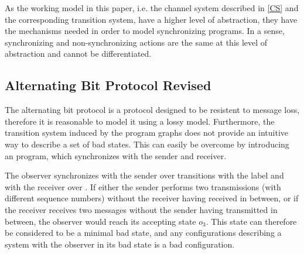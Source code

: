 As the working model in this paper, i.e. the channel system described in \ref{CS} and the corresponding transition system, have a higher level of abstraction, they have the mechanisms needed in order to model synchronizing programs. In a sense, synchronizing and non-synchronizing actions are the same at this level of abstraction and cannot be differentiated.

\subsection{Alternating Bit Protocol Revised}
The alternating bit protocol is a protocol designed to be resistent to message loss, therefore it is reasonable to model it using a lossy model. Furthermore, the transition system induced by the program graphs  does not provide an intuitive way to describe a set  of bad states. This can easily be overcome by introducing an  program, which synchronizes with the sender and receiver.

\begin{figure}[h!]
\abpobserver
\label{abpobserver}
\end{figure}

The observer synchronizes with the sender over transitions with the label  and with the receiver over . If either the sender performs two transmissions (with different sequence numbers) without the receiver having received in between, or if the receiver receives two messages without the sender having transmitted in between, the observer would reach its accepting state $o_3$. This state can therefore be considered to be a minimal bad state, and any configurations describing a system with the observer in its bad state is a bad configuration.
